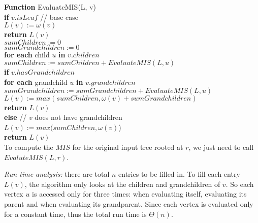 \documentclass[11pt]{article}
\begin{document}
\begin{enumerate}
  \textbf{Function} EvaluateMIS(L, v) \\
  \-\hspace{2em} \textbf{if} $v.isLeaf$ // base case \\
  \-\hspace{4em} $L(v) := \omega(v)$ \\
  \-\hspace{4em} \textbf{return} $L(v)$ \\
  \-\hspace{2em} $sumChildren := 0$ \\
  \-\hspace{2em} $sumGrandchildren := 0$ \\
  \-\hspace{2em} \textbf{for each} child $u$ \textbf{in} $v.children$ \\
  \-\hspace{4em} $sumChildren := sumChildren + EvaluateMIS(L, u)$ \\
  \-\hspace{2em} \textbf{if} $v.hasGrandchildren$ \\
  \-\hspace{4em} \textbf{for each} grandchild $u$ \textbf{in}
  $v.grandchildren$ \\
  \-\hspace{6em} $sumGrandchildren := sumGrandchildren +
  EvaluateMIS(L,u)$ \\
  \-\hspace{4em} $L(v) := max(sumChildren, \omega(v) +
  sumGrandchildren)$ \\
  \-\hspace{4em} \textbf{return} $L(v)$ \\
  \-\hspace{2em} \textbf{else} // $v$ does not have grandchildren \\
  \-\hspace{4em} $L(v) := max(sumChildren, \omega(v)$) \\
  \-\hspace{4em} \textbf{return} $L(v)$ \\

  To compute the $MIS$ for the original input tree rooted at $r$, we
  just need to call $EvaluteMIS(L, r)$.

  \emph{Run time analysis:} there are total $n$ entries to be filled
  in. To fill each entry $L(v)$, the algorithm only looks at the
  children and grandchildren of $v$. So each vertex $u$ is accessed only
  for three times: when evaluating itself, evaluating its parent and
  when evaluating its grandparent. Since each vertex is evaluated only
  for a constant time, thus the total run time is $\Theta(n)$.\\\\\\\\\\\\



\end{enumerate}
\end{document}
